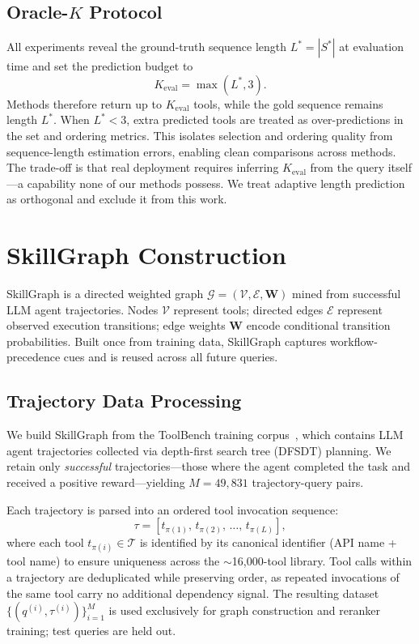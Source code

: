 \documentclass[lettersize,journal]{IEEEtran}
\begin{document}
\subsection{Oracle-$K$ Protocol}

All experiments reveal the ground-truth sequence length $L^* = |S^*|$ at evaluation time and set the prediction budget to
\begin{equation}
K_{\mathrm{eval}} = \max(L^*, 3).
\end{equation}
Methods therefore return up to $K_{\mathrm{eval}}$ tools, while the gold sequence remains length $L^*$.
When $L^* < 3$, extra predicted tools are treated as over-predictions in the set and ordering metrics.
This isolates selection and ordering quality from sequence-length estimation errors, enabling clean comparisons across methods.
The trade-off is that real deployment requires inferring $K_{\mathrm{eval}}$ from the query itself---a capability none of our methods possess.
We treat adaptive length prediction as orthogonal and exclude it from this work.

\section{SkillGraph Construction}
\label{sec:skillgraph}

SkillGraph is a directed weighted graph $\mathcal{G} = (\mathcal{V}, \mathcal{E}, \mathbf{W})$
mined from successful LLM agent trajectories.
Nodes $\mathcal{V}$ represent tools; directed edges $\mathcal{E}$ represent observed execution transitions; edge weights $\mathbf{W}$ encode conditional transition probabilities.
Built once from training data, SkillGraph captures workflow-precedence cues and is reused across all future queries.

\subsection{Trajectory Data Processing}

We build SkillGraph from the ToolBench training corpus~\cite{toolllm}, which contains LLM agent trajectories collected via depth-first search tree (DFSDT) planning.
We retain only \emph{successful} trajectories---those where the agent completed the task and received a positive reward---yielding $M = 49{,}831$ trajectory-query pairs.

Each trajectory is parsed into an ordered tool invocation sequence:
\begin{equation}
    \tau = [t_{\pi(1)},\, t_{\pi(2)},\, \ldots,\, t_{\pi(L)}],
    \label{eq:traj}
\end{equation}
where each tool $t_{\pi(i)} \in \mathcal{T}$ is identified by its canonical identifier (API name + tool name) to ensure uniqueness across the $\sim$16,000-tool library.
Tool calls within a trajectory are deduplicated while preserving order, as repeated invocations of the same tool carry no additional dependency signal.
The resulting dataset $\{(q^{(i)}, \tau^{(i)})\}_{i=1}^{M}$ is used exclusively for graph construction and reranker training; test queries are held out.
\end{document}
